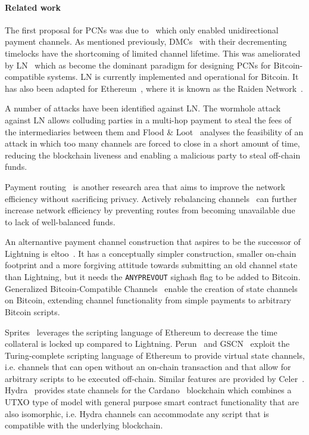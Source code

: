 
\paragraph{Related work}
 The first proposal for PCNs was due to~\cite{spilman} which only enabled
 unidirectional payment channels. As mentioned previously, DMCs~\cite{decker} with their decrementing timelocks have the shortcoming of limited channel lifetime. This was ameliorated by LN~\cite{lightning} which as become the dominant paradigm for designing PCNs for Bitcoin-compatible systems. 
 LN is currently implemented and operational for
  Bitcoin. It has also been adapted for Ethereum~\cite{wood2014ethereum}, where
  it is known as the Raiden Network~\cite{raiden}.

A number of attacks have been identified against LN. The wormhole
  attack~\cite{DBLP:conf/ndss/MalavoltaMSKM19} against LN allows
  colluding parties in a multi-hop payment to steal the fees of the
  intermediaries between them and Flood \& Loot~\cite{10.1145/3419614.3423248}
  analyses the feasibility of an attack in which too many channels are forced to
  close in a short amount of time, reducing the blockchain liveness and enabling
  a malicious party to steal off-chain funds.

  Payment routing~\cite{spider,prihodko2016flare,lee2020routee} is another research area that aims to improve the network efficiency without sacrificing  privacy. Actively rebalancing channels~\cite{DBLP:conf/ccs/KhalilG17} can
  further increase network efficiency by preventing routes from becoming   unavailable due to lack of well-balanced funds.

  An alternantive payment channel construction that aspires to be the successor
  of Lightning is eltoo~\cite{eltoo}. It has a conceptually simpler
  construction, smaller on-chain footprint and a more forgiving attitude towards
  submitting an old channel state than Lightning, but it needs the
  \texttt{ANYPREVOUT} sighash flag to be added to Bitcoin. Generalized
  Bitcoin-Compatible Channels~\cite{cryptoeprint:2020:476} enable the creation
  of state channels on Bitcoin, extending channel functionality from simple
  payments to arbitrary Bitcoin scripts.

  Sprites~\cite{sprites} leverages the scripting language of Ethereum to
  decrease the time collateral is locked up compared to Lightning.
  Perun~\cite{perun} and GSCN~\cite{DBLP:conf/ccs/DziembowskiFH18} exploit the
  Turing-complete scripting language of Ethereum to provide virtual state
  channels, i.e. channels that can open without an on-chain transaction and that
  allow for arbitrary scripts to be executed off-chain. Similar features are
  provided by Celer~\cite{dong2018celer}. Hydra~\cite{cryptoeprint:2020:299}
  provides state channels for the Cardano~\cite{cardano} blockchain which
  combines a UTXO type of model with general purpose smart contract
  functionality that are also isomorphic, i.e. Hydra channels can accommodate
  any script that is compatible with the underlying blockchain.


